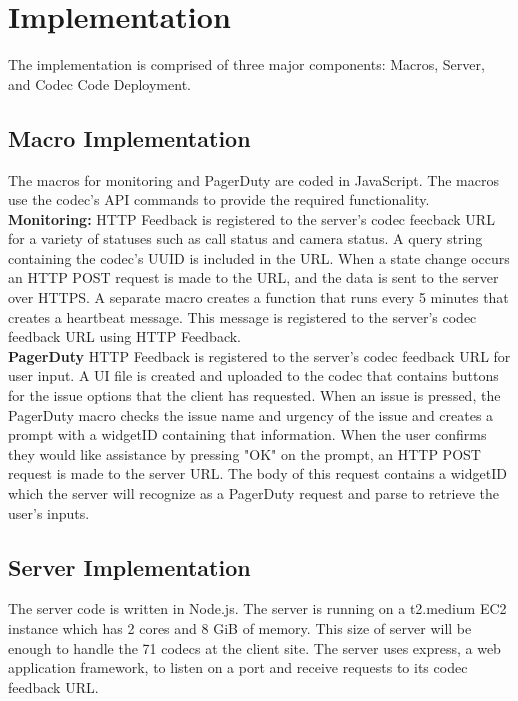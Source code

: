 \documentclass[letterpaper,12pt]{article}
\begin{document}
\section{Implementation}
The implementation is comprised of three major components: Macros, Server, and Codec Code Deployment.
\subsection{Macro Implementation}
The macros for monitoring and PagerDuty are coded in JavaScript. The macros use the codec's API commands to provide the required functionality.\\

\textbf{Monitoring:} HTTP Feedback is registered to the server's codec feecback URL for a variety of statuses such as call status and camera status. A query string containing the codec's UUID is included in the URL. When a state change occurs an HTTP POST request is made to the URL, and the data is sent to the server over HTTPS. A separate macro creates a function that runs every 5 minutes that creates a heartbeat message. This message is registered to the server's codec feedback URL using HTTP Feedback.\\

\textbf{PagerDuty} HTTP Feedback is registered to the server's codec feedback URL for user input. A UI file is created and uploaded to the codec that contains buttons for the issue options that the client has requested. When an issue is pressed, the PagerDuty macro checks the issue name and urgency of the issue and creates a prompt with a widgetID containing that information. When the user confirms they would like assistance by pressing "OK" on the prompt, an HTTP POST request is made to the server URL. The body of this request contains a widgetID which the server will recognize as a PagerDuty request and parse to retrieve the user's inputs.


\subsection{Server Implementation}
The server code is written in Node.js. The server is running on a t2.medium EC2 instance which has 2 cores and 8 GiB of memory. This size of server will be enough to handle the 71 codecs at the client site. The server uses express, a web application framework, to listen on a port and receive requests to its codec feedback URL.\\
\end{document}
